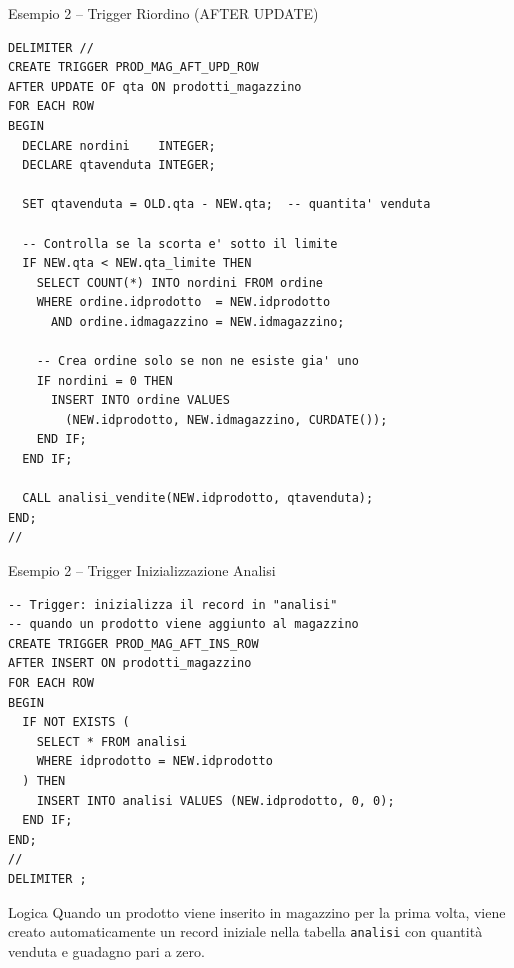 \documentclass[aspectratio=169]{beamer}
\begin{document}
\begin{frame}[fragile]{Esempio 2 -- Trigger Riordino (AFTER UPDATE)}
  \begin{lstlisting}[style=sqlstyle]
DELIMITER //
CREATE TRIGGER PROD_MAG_AFT_UPD_ROW
AFTER UPDATE OF qta ON prodotti_magazzino
FOR EACH ROW
BEGIN
  DECLARE nordini    INTEGER;
  DECLARE qtavenduta INTEGER;

  SET qtavenduta = OLD.qta - NEW.qta;  -- quantita' venduta

  -- Controlla se la scorta e' sotto il limite
  IF NEW.qta < NEW.qta_limite THEN
    SELECT COUNT(*) INTO nordini FROM ordine
    WHERE ordine.idprodotto  = NEW.idprodotto
      AND ordine.idmagazzino = NEW.idmagazzino;

    -- Crea ordine solo se non ne esiste gia' uno
    IF nordini = 0 THEN
      INSERT INTO ordine VALUES
        (NEW.idprodotto, NEW.idmagazzino, CURDATE());
    END IF;
  END IF;

  CALL analisi_vendite(NEW.idprodotto, qtavenduta);
END;
//
  \end{lstlisting}
\end{frame}

\begin{frame}[fragile]{Esempio 2 -- Trigger Inizializzazione Analisi}
  \begin{lstlisting}[style=sqlstyle]
-- Trigger: inizializza il record in "analisi"
-- quando un prodotto viene aggiunto al magazzino
CREATE TRIGGER PROD_MAG_AFT_INS_ROW
AFTER INSERT ON prodotti_magazzino
FOR EACH ROW
BEGIN
  IF NOT EXISTS (
    SELECT * FROM analisi
    WHERE idprodotto = NEW.idprodotto
  ) THEN
    INSERT INTO analisi VALUES (NEW.idprodotto, 0, 0);
  END IF;
END;
//
DELIMITER ;
  \end{lstlisting}
  \begin{block}{Logica}
    Quando un prodotto viene inserito in magazzino per la prima volta,
    viene creato automaticamente un record iniziale nella tabella \texttt{analisi}
    con quantità venduta e guadagno pari a zero.
  \end{block}
\end{frame}
\end{document}
